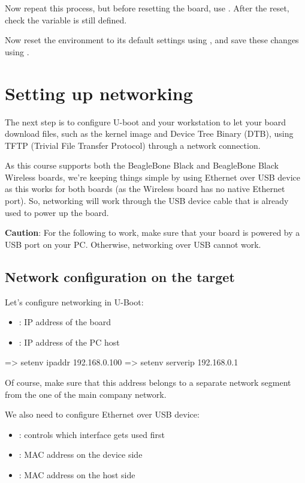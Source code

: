 Now repeat this process, but before resetting the board, use
. After the reset, check the  variable is
still defined.

Now reset the environment to its default settings using , and save these changes using .

\section{Setting up networking}

The next step is to configure U-boot and your workstation to let your board
download files, such as the kernel image and Device Tree Binary (DTB), using
TFTP (Trivial File Transfer Protocol) through a network connection.

As this course supports both the BeagleBone Black and BeagleBone Black
Wireless boards, we're keeping things simple by using Ethernet over USB
device as this works for both boards (as the Wireless board has no
native Ethernet port). So, networking will work through the USB device
cable that is already used to power up the board.

{\bf Caution}: For the following to work, make sure that your board
is powered by a USB port on your PC. Otherwise, networking over USB
cannot work.

\subsection{Network configuration on the target}

Let's configure networking in U-Boot:

\begin{itemize}
  \item {}: IP address of the board
  \item {}: IP address of the PC host
\end{itemize}

\begin{ubootinput}
=> setenv ipaddr 192.168.0.100
=> setenv serverip 192.168.0.1
\end{ubootinput}

Of course, make sure that this address belongs to a separate network
segment from the one of the main company network.

We also need to configure Ethernet over USB device:
\begin{itemize}
  \item {}: controls which interface gets used first
  \item {}: MAC address on the device side
  \item {}: MAC address on the host side
\end{itemize}


